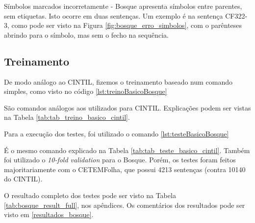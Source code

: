\begin{center}
    
\end{center}

Símbolos marcados incorretamente - Bosque apresenta símbolos entre parentes, sem etiquetas. Isto ocorre em duas sentenças. Um exemplo é na sentença CF322-3, como pode ser visto na Figura \ref{fig:bosque_erro_simbolos}, com o parênteses abrindo para o símbolo, mas sem o fecho na sequência. 

\begin{center}
    
\end{center}

\subsection{Treinamento}
\label{subsec:treinamento_bosque}
De modo análogo ao CINTIL, fizemos o treinamento baseado num comando simples, como visto no código \ref{lst:treinoBasicoBosque}
\begin{center}
    
\end{center}
São comandos análogos aos utilizados para CINTIL. Explicações podem ser vistas na Tabela \ref{tab:tab_treino_basico_cintil}.

Para a execução dos testes, foi utilizado o comando \ref{lst:testeBasicoBosque}
\begin{center}
    
\end{center}
É o mesmo comando explicado na Tabela \ref{tab:tab_teste_basico_cintil}. Também foi utilizado o \textit{10-fold validation} para o Bosque. Porém, os testes foram feitos majoritariamente com o CETEMFolha, que possui 4213 sentenças (contra 10140 do CINTIL).

O resultado completo dos testes pode ser visto na Tabela \ref{tab:bosque_result_full}, nos apêndices. Os comentários dos resultados pode ser visto em \ref{resultados_bosque}.
